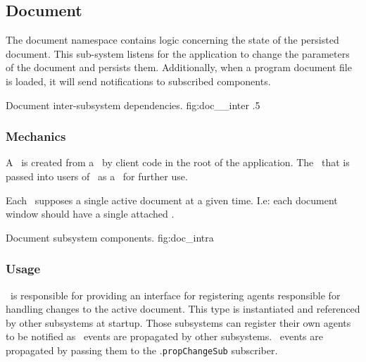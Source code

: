 \newcommand{\docarea}[3]{
      \index{#1}\pbodyitem{#2}{#3}
}

\newcommand{\extparamref}[3]{
      \index{#1}\pbodyitem{#2}{#3}
}

\subsection{Document}
The document namespace contains logic concerning the state of the persisted document.
This sub-system listens for the application to change the parameters of the document and persists them.
Additionally, when a program document file is loaded, it will send notifications to subscribed components.

{Document inter-subsystem dependencies.}
{fig:doc__inter}
{.5}


\subsubsection{Mechanics}
A \docsftype\ is created from a \docsfftype\ by client code in the root of the application.
The \docsftype\ that is passed into users of \docmod\ as a \docftype\ for further use.

Each \docftype\ supposes a single active document at a given time.
I.e: each document window should have a single attached \docftype.

{Document subsystem components.}
{fig:doc_intra}



\subsubsection{Usage}
\docftype\ is responsible for providing an interface for registering agents responsible for handling changes to the active document.
This type is instantiated and referenced by other subsystems at startup.
Those subsystems can register their own agents to be notified as \docpctype\ events are propagated by other subsystems.
\docpctype\ events are propagated by passing them to the \docftype .\texttt{propChangeSub} subscriber.